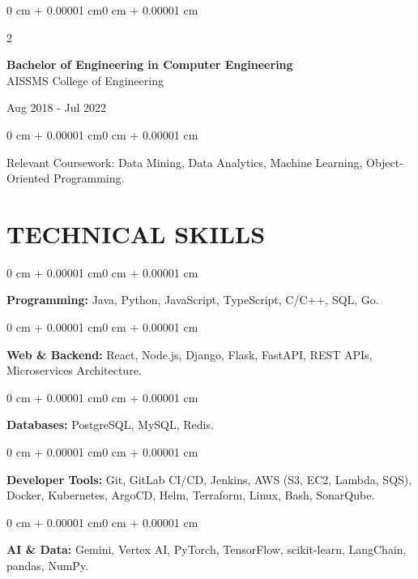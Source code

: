 \documentclass[10pt, letterpaper]{article}
\newenvironment{onecolentry}{
    \begin{adjustwidth}{0 cm + 0.00001 cm}{0 cm + 0.00001 cm}
}{
    \end{adjustwidth}
}
\newenvironment{twocolentry}[2][]{
    \onecolentry
    \def\secondColumn{#2}
    \setcolumnwidth{\fill, 4.5 cm}
    \begin{paracol}{2}
}{
    \switchcolumn \raggedleft \secondColumn
    \end{paracol}
    \endonecolentry
}
\begin{document}
\begin{twocolentry}{
    Aug 2018 - Jul 2022
}
    \textbf{Bachelor of Engineering in Computer Engineering} \\
    AISSMS College of Engineering
\end{twocolentry}
\begin{onecolentry}
Relevant Coursework: Data Mining, Data Analytics, Machine Learning, Object-Oriented Programming.
\end{onecolentry}
\section{TECHNICAL SKILLS}
\begin{onecolentry}
\textbf{Programming:} Java, Python, JavaScript, TypeScript, C/C++, SQL, Go.
\end{onecolentry}
\vspace{0.06 cm}
\begin{onecolentry}
\textbf{Web \& Backend:} React, Node.js, Django, Flask, FastAPI, REST APIs, Microservices Architecture.
\end{onecolentry}
\vspace{0.06 cm}
\begin{onecolentry}
\textbf{Databases:} PostgreSQL, MySQL, Redis.
\end{onecolentry}
\vspace{0.06 cm}
\begin{onecolentry}
\textbf{Developer Tools:} Git, GitLab CI/CD, Jenkins, AWS (S3, EC2, Lambda, SQS), Docker, Kubernetes, ArgoCD, Helm, Terraform, Linux, Bash, SonarQube.
\end{onecolentry}
\vspace{0.06 cm}
\begin{onecolentry}
\textbf{AI \& Data:} Gemini, Vertex AI, PyTorch, TensorFlow, scikit-learn, LangChain, pandas, NumPy.
\end{onecolentry}

\end{document}
